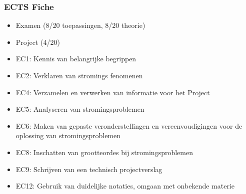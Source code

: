 \documentclass[t]{beamer}
\begin{document}
	\begin{frame}
		\frametitle{ECTS Fiche}
		\begin{itemize}
			\item Examen (8/20 toepassingen, 8/20 theorie)
			\item Project (4/20)
		\end{itemize}
		\begin{itemize}
			\item EC1: Kennis van belangrijke begrippen
			\item EC2: Verklaren van stromings fenomenen
			\item EC4: Verzamelen en verwerken van informatie voor het Project
			\item EC5: Analyseren van stromingsproblemen
			\item EC6: Maken van gepaste veronderstellingen en vereenvoudigingen voor de oplossing van stromingsproblemen
			\item EC8: Inschatten van grootteordes bij stromingsproblemen
			\item EC9: Schrijven van een technisch projectverslag
			\item EC12: Gebruik van duidelijke notaties, omgaan met onbekende materie		
		\end{itemize}
  	\end{frame}
\end{document}
